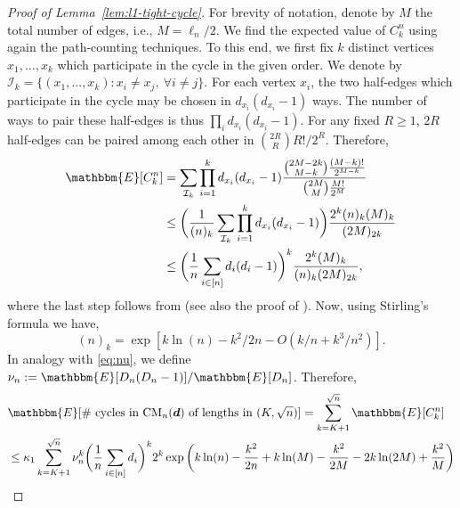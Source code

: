 \documentclass[11pt,a4paper, reqno]{article}
\numberwithin{equation}{section}
\numberwithin{equation}{section}
\newcommand{\1}{\ensuremath{\mathbbm{1}}}
\numberwithin{equation}{section}
\numberwithin{theorem}{section}
\begin{document}
\begin{proof}[{Proof of Lemma~\ref{lem:l1-tight-cycle}}]
For brevity of notation, denote by $M$ the total number of edges, i.e., $M=\ell_n/2$.
We find the expected value of $C_k^n$ using again the path-counting techniques.
 To this end, we first fix $k$ distinct vertices $x_1,\dots,x_k$ which participate in the cycle in the given order. We denote by $\mathcal{I}_k = \{(x_1,\dots,x_k):x_i\neq x_j,\ \forall i\neq j\}$. For each vertex $x_i$, the two half-edges which participate in the cycle may be chosen in $d_{x_i} ( d_{x_i}-1)$ ways. The number of ways to pair these half-edges is thus $\prod_i d_{x_i}(d_{x_i}-1)$. 
For any fixed $R\geq 1$, $2R$ half-edges can be paired among each other in $\binom{2R}{R} R!/2^R$. 
Therefore,
\begin{equation}
\begin{split}
\mathbbm{E}[C_k^n]
&=\sum_{\mathcal{I}_k}\prod_{i=1}^k d_{x_i}(d_{x_i}-1)\frac{ \binom{2M-2k}{ M-k}\frac{(M-k)!}{2^{M-k}}}{\binom{2M}{M}\frac{M!}{2^{M}}}\\
&\leq \bigg(\frac{1}{(n)_k}\sum_{\mathcal{I}_k}\prod_{i=1}^k d_{x_i}(d_{x_i}-1)\bigg)\frac{2^k(n)_k(M)_k}{(2M)_{2k}}\\
&\leq\bigg(\frac{1}{n}\sum_{i\in [n]} d_i(d_i-1)\bigg)^k\frac{2^k(M)_k}{(n)_k(2M)_{2k}},
\end{split}
\end{equation}where the last step follows from \cite[Theorem 52]{HLP53} (see also the proof of \cite[Lemma 5.1]{J09c}).
Now, using Stirling's formula we have,
$$(n)_k= \exp[k\ln (n)-k^2/2n-O(k/n+k^3/n^2)].$$
In analogy with \eqref{eq:nu}, we define $\nu_n := \mathbbm{E}[D_n(D_n-1)]/\mathbbm{E}[D_n]$. 
Therefore,
\begin{align}
&\mathbbm{E}[\#\mbox{ cycles in }\mathrm{CM}_n(\boldsymbol{d}) \text{ of lengths in } (K, \sqrt{n})]=\sum_{k=K+1}^{\sqrt{n}}\mathbbm{E}[C_k^n] \nonumber \\
&\leq \kappa_1\sum_{k=K+1}^{\sqrt{n}} \nu_n^k\bigg(\frac{1}{n}\sum_{i\in [n]} d_i\bigg)^k 2^k\exp\bigg(k\ln (n)-\frac{k^2}{2n}+k\ln( M)-\frac{k^2}{2M}-2k\ln (2M)+\frac{k^2}{M}\bigg) \nonumber \\   

\end{align}
\end{proof}
\end{document}
